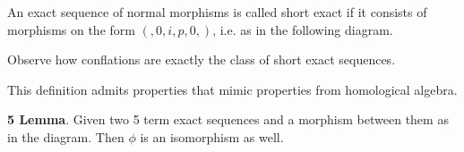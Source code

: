    \begin{remark}
        An exact sequence of normal morphisms is called short exact if it consists of morphisms on the form $(,0,i,p,0,)$, i.e. as in the following diagram.

        \begin{center}
        \end{center}

        Observe how conflations are exactly the class of short exact sequences.
    \end{remark}

    This definition admits properties that mimic properties from homological algebra.

    \begin{lemma}
        \textbf{5 Lemma}. Given two 5 term exact sequences and a morphism between them as in the diagram. Then $\phi$ is an isomorphism as well.
        \begin{center}
        \end{center}
    \end{lemma}


